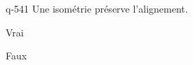 \begin{truefalse}{q-541}
Une isométrie préserve l'alignement.
\item* Vrai
\item Faux
\end{truefalse}

